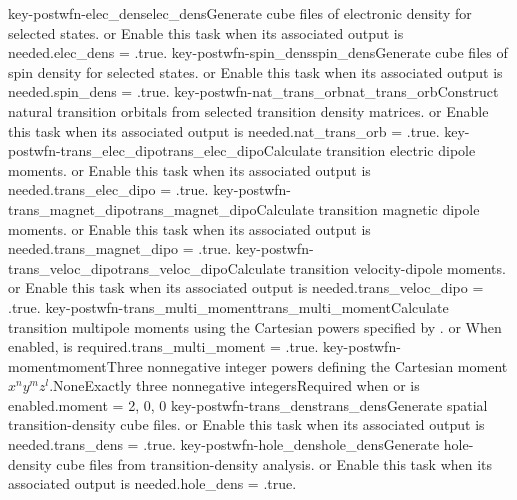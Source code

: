 \keyword
{key-postwfn-elec_dens}{elec\_dens}{Generate cube files of electronic density for selected states.}{\OpOptional}{\OpLogic}{\OpFalse}{\OpTrue{} or \OpFalse}{Enable this task when its associated output is needed.}{elec\_dens = .true.}
\keyword
{key-postwfn-spin_dens}{spin\_dens}{Generate cube files of spin density for selected states.}{\OpOptional}{\OpLogic}{\OpFalse}{\OpTrue{} or \OpFalse}{Enable this task when its associated output is needed.}{spin\_dens = .true.}
\keyword
{key-postwfn-nat_trans_orb}{nat\_trans\_orb}{Construct natural transition orbitals from selected transition density matrices.}{\OpOptional}{\OpLogic}{\OpFalse}{\OpTrue{} or \OpFalse}{Enable this task when its associated output is needed.}{nat\_trans\_orb = .true.}
\keyword
{key-postwfn-trans_elec_dipo}{trans\_elec\_dipo}{Calculate transition electric dipole moments.}{\OpOptional}{\OpLogic}{\OpFalse}{\OpTrue{} or \OpFalse}{Enable this task when its associated output is needed.}{trans\_elec\_dipo = .true.}
\keyword
{key-postwfn-trans_magnet_dipo}{trans\_magnet\_dipo}{Calculate transition magnetic dipole moments.}{\OpOptional}{\OpLogic}{\OpFalse}{\OpTrue{} or \OpFalse}{Enable this task when its associated output is needed.}{trans\_magnet\_dipo = .true.}
\keyword
{key-postwfn-trans_veloc_dipo}{trans\_veloc\_dipo}{Calculate transition velocity-dipole moments.}{\OpOptional}{\OpLogic}{\OpFalse}{\OpTrue{} or \OpFalse}{Enable this task when its associated output is needed.}{trans\_veloc\_dipo = .true.}
\keyword
{key-postwfn-trans_multi_moment}{trans\_multi\_moment}{Calculate transition multipole moments using the Cartesian powers specified by .}{\OpOptional}{\OpLogic}{\OpFalse}{\OpTrue{} or \OpFalse}{When enabled,  is required.}{trans\_multi\_moment = .true.}
\keyword
{key-postwfn-moment}{moment}{Three nonnegative integer powers defining the Cartesian moment $x^n y^m z^l$.}{\OpOptional}{\OpIntseq}{None}{Exactly three nonnegative integers}{Required when  or  is enabled.}{moment = 2, 0, 0}
\keyword
{key-postwfn-trans_dens}{trans\_dens}{Generate spatial transition-density cube files.}{\OpOptional}{\OpLogic}{\OpFalse}{\OpTrue{} or \OpFalse}{Enable this task when its associated output is needed.}{trans\_dens = .true.}
\keyword
{key-postwfn-hole_dens}{hole\_dens}{Generate hole-density cube files from transition-density analysis.}{\OpOptional}{\OpLogic}{\OpFalse}{\OpTrue{} or \OpFalse}{Enable this task when its associated output is needed.}{hole\_dens = .true.}

